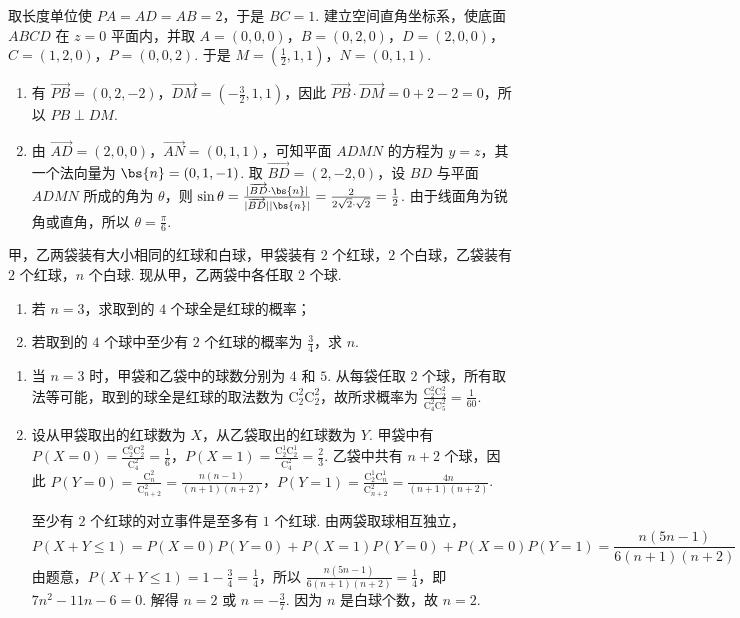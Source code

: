 \begin{solution}
取长度单位使 \(PA=AD=AB=2\)，于是 \(BC=1\). 建立空间直角坐标系，使底面 \(ABCD\) 在 \(z=0\) 平面内，并取 \(A=(0,0,0)\)，\(B=(0,2,0)\)，\(D=(2,0,0)\)，\(C=(1,2,0)\)，\(P=(0,0,2)\). 于是 \(M=\left(\frac12,1,1\right)\)，\(N=(0,1,1)\).

\begin{enumerate}
\item 有 \(\overrightarrow{PB}=(0,2,-2)\)，\(\overrightarrow{DM}=\left(-\frac32,1,1\right)\)，因此 \(\overrightarrow{PB}\cdot\overrightarrow{DM}=0+2-2=0\)，所以 \(PB\perp DM\).

\item 由 \(\overrightarrow{AD}=(2,0,0)\)，\(\overrightarrow{AN}=(0,1,1)\)，可知平面 \(ADMN\) 的方程为 \(y=z\)，其一个法向量为 \(\bs{n}=(0,1,-1)\). 取 \(\overrightarrow{BD}=(2,-2,0)\)，设 \(BD\) 与平面 \(ADMN\) 所成的角为 \(\theta\)，则 \(\sin\theta=\frac{\lvert\overrightarrow{BD}\cdot\bs{n}\rvert}{\lvert\overrightarrow{BD}\rvert\lvert\bs{n}\rvert}=\frac{2}{2\sqrt2\cdot\sqrt2}=\frac12\). 由于线面角为锐角或直角，所以 \(\theta=\frac{\pi}{6}\).
\end{enumerate}
\end{solution}

\begin{problem}
甲，乙两袋装有大小相同的红球和白球，甲袋装有 \(2\) 个红球，\(2\) 个白球，乙袋装有 \(2\) 个红球，\(n\) 个白球. 现从甲，乙两袋中各任取 \(2\) 个球.

\begin{enumerate}
\item 若 \(n = 3\)，求取到的 \(4\) 个球全是红球的概率；
\item 若取到的 \(4\) 个球中至少有 \(2\) 个红球的概率为 \(\frac{3}{4}\)，求 \(n\).
\end{enumerate}
\end{problem}

\begin{solution}
\begin{enumerate}
\item 当 \(n=3\) 时，甲袋和乙袋中的球数分别为 \(4\) 和 \(5\). 从每袋任取 \(2\) 个球，所有取法等可能，取到的球全是红球的取法数为 \(\mathrm C_2^2\mathrm C_2^2\)，故所求概率为 \(\frac{\mathrm C_2^2\mathrm C_2^2}{\mathrm C_4^2\mathrm C_5^2}=\frac1{60}\).

\item 设从甲袋取出的红球数为 \(X\)，从乙袋取出的红球数为 \(Y\). 甲袋中有 \(P(X=0)=\frac{\mathrm C_2^0\mathrm C_2^2}{\mathrm C_4^2}=\frac16\)，\(P(X=1)=\frac{\mathrm C_2^1\mathrm C_2^1}{\mathrm C_4^2}=\frac23\). 乙袋中共有 \(n+2\) 个球，因此 \(P(Y=0)=\frac{\mathrm C_n^2}{\mathrm C_{n+2}^2}=\frac{n(n-1)}{(n+1)(n+2)}\)，\(P(Y=1)=\frac{\mathrm C_2^1\mathrm C_n^1}{\mathrm C_{n+2}^2}=\frac{4n}{(n+1)(n+2)}\).

至少有 \(2\) 个红球的对立事件是至多有 \(1\) 个红球. 由两袋取球相互独立，
\[
P(X+Y\leqslant1)=P(X=0)P(Y=0)+P(X=1)P(Y=0)+P(X=0)P(Y=1)
=\frac{n(5n-1)}{6(n+1)(n+2)}
\]
由题意，\(P(X+Y\leqslant1)=1-\frac34=\frac14\)，所以 \(\frac{n(5n-1)}{6(n+1)(n+2)}=\frac14\)，即 \(7n^2-11n-6=0\). 解得 \(n=2\) 或 \(n=-\frac37\). 因为 \(n\) 是白球个数，故 \(n=2\).
\end{enumerate}
\end{solution}

